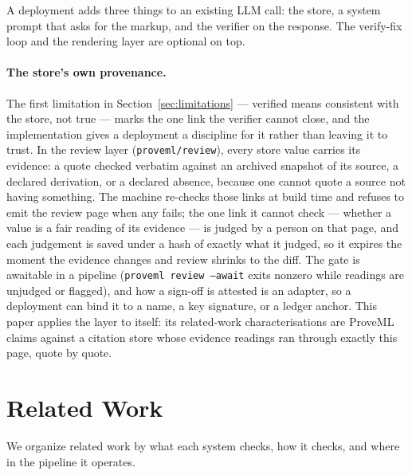 \documentclass[11pt,a4paper]{article}
\begin{document}
\noindent A deployment adds three things to an existing LLM call: the store, a system prompt that asks for the markup, and the verifier on the response. The verify-fix loop and the rendering layer are optional on top.

\paragraph{The store's own provenance.} The first limitation in Section~\ref{sec:limitations} --- verified means consistent with the store, not true --- marks the one link the verifier cannot close, and the implementation gives a deployment a discipline for it rather than leaving it to trust. In the review layer (\texttt{proveml/review}), every store value carries its evidence: a quote checked verbatim against an archived snapshot of its source, a declared derivation, or a declared absence, because one cannot quote a source not having something. The machine re-checks those links at build time and refuses to emit the review page when any fails; the one link it cannot check --- whether a value is a fair reading of its evidence --- is judged by a person on that page, and each judgement is saved under a hash of exactly what it judged, so it expires the moment the evidence changes and review shrinks to the diff. The gate is awaitable in a pipeline (\texttt{proveml review --await} exits nonzero while readings are unjudged or flagged), and how a sign-off is attested is an adapter, so a deployment can bind it to a name, a key signature, or a ledger anchor. This paper applies the layer to itself: its related-work characterisations are ProveML claims against a citation store whose evidence readings ran through exactly this page, quote by quote.

\section{Related Work}

We organize related work by what each system checks, how it checks, and where in the pipeline it operates.
\end{document}
